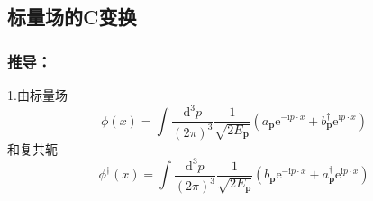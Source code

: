 \subsection{标量场的C变换}



\subsubsection{推导：}
1.由标量场
\begin{equation}
    \phi \left( x \right) =\int{\frac{\mathrm{d}^3p}{\left( 2\pi \right) ^3}}\frac{1}{\sqrt{2E_{\mathbf{p}}}}\left( a_{\mathbf{p}}\mathrm{e}^{-\mathrm{i}p\cdot x}+b_{\mathbf{p}}^{\dagger}\mathrm{e}^{\mathrm{i}p\cdot x} \right) 
\end{equation}
和复共轭
\begin{equation}
    \phi ^{\dagger}(x)=\int{\frac{\mathrm{d}^3p}{\left( 2\pi \right) ^3}}\frac{1}{\sqrt{2E_{\mathbf{p}}}}\left( b_{\mathbf{p}}\mathrm{e}^{-\mathrm{i}p\cdot x}+a_{\mathbf{p}}^{\dagger}\mathrm{e}^{\mathrm{i}p\cdot x} \right) 
\end{equation}

